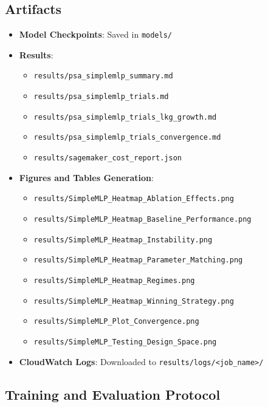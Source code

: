 \documentclass[conference]{IEEEtran}
\begin{document}
\subsection*{Artifacts}

\begin{itemize}
  \item \textbf{Model Checkpoints}: Saved in \texttt{models/}
  \item \textbf{Results}:
    \begin{itemize}
      \item \texttt{results/psa\_simplemlp\_summary.md}
      \item \texttt{results/psa\_simplemlp\_trials.md}
      \item \texttt{results/psa\_simplemlp\_trials\_lkg\_growth.md}
      \item \texttt{results/psa\_simplemlp\_trials\_convergence.md}
      \item \texttt{results/sagemaker\_cost\_report.json}
    \end{itemize}
    \item \textbf{Figures and Tables Generation}:
      \begin{itemize}
        \item \texttt{results/SimpleMLP\_Heatmap\_Ablation\_Effects.png}
        \item \texttt{results/SimpleMLP\_Heatmap\_Baseline\_Performance.png}
        \item \texttt{results/SimpleMLP\_Heatmap\_Instability.png}
        \item \texttt{results/SimpleMLP\_Heatmap\_Parameter\_Matching.png}
        \item \texttt{results/SimpleMLP\_Heatmap\_Regimes.png}
        \item \texttt{results/SimpleMLP\_Heatmap\_Winning\_Strategy.png}
        \item \texttt{results/SimpleMLP\_Plot\_Convergence.png}
        \item \texttt{results/SimpleMLP\_Testing\_Design\_Space.png}
      \end{itemize}
  \item \textbf{CloudWatch Logs}: Downloaded to \texttt{results/logs/<job\_name>/}
\end{itemize}

\subsection*{Training and Evaluation Protocol}
\end{document}

